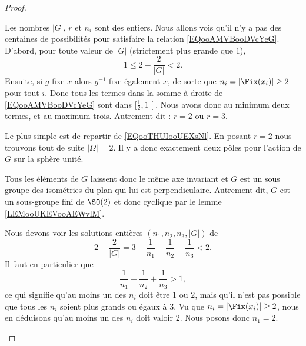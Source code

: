 \begin{proof}
\begin{subproof}
            Les nombres \( | G |\), \( r\) et \( n_i\) sont des entiers. Nous allons vois qu'il n'y a pas des centaines de possibilités pour satisfaire la relation \eqref{EQooAMVBooDVcYeG}. D'abord, pour toute valeur de \( | G |\) (strictement plus grande que \( 1\)),
            \begin{equation}
                1\leq 2-\frac{ 2 }{ | G | }<2.
            \end{equation}
            Ensuite, si \( g\) fixe \( x\) alors \( g^{-1}\) fixe également \( x\), de sorte que \( n_i=| \Fix(x_i) |\geq 2\) pour tout \( i\). Donc tous les termes dans la somme à droite de \eqref{EQooAMVBooDVcYeG} sont dans \( \mathopen[ \frac{ 1 }{2} , 1 \mathclose[\). Nous avons donc au minimum deux termes, et au maximum trois. Autrement dit : \( r=2\) ou \( r=3\).

            \item[Si \( r=2\)]

                Le plus simple est de repartir de \eqref{EQooTHUIooUEXsNl}. En posant \( r=2\) nous trouvons tout de suite \( | \Omega |=2\). Il y a donc exactement deux pôles pour l'action de \( G\) sur la sphère unité.

                Tous les éléments de \( G\) laissent donc le même axe invariant et \( G\) est un sous groupe des isométries du plan qui lui est perpendiculaire. Autrement dit, \( G\) est un sous-groupe fini de \( \SO(2)\) et donc cyclique par le lemme \ref{LEMooUKEVooAEWvlM}.

            \item[Les possibilités pour \( r=3\)]

                Nous devons voir les solutions entières \( (n_1,n_2,n_3,| G |)\) de
                \begin{equation}
                    2-\frac{ 2 }{ | G | }=3-\frac{1}{ n_1 }-\frac{1}{ n_2 }-\frac{1}{ n_3 }<2.
                \end{equation}
                Il faut en particulier que
                \begin{equation}
                    \frac{1}{ n_1 }+\frac{1}{ n_2 }+\frac{1}{ n_3 }>1,
                \end{equation}
                ce qui signifie qu'au moins un des \( n_i\) doit être \( 1\) ou \( 2\), mais qu'il n'est pas possible que tous les \( n_i\) soient plus grands ou égaux à \( 3\). Vu que \( n_i=| \Fix(x_i) |\geq 2\), nous en déduisons qu'au moins un des \( n_i\) doit valoir \( 2\). Nous posons donc \( n_1=2\).


\end{subproof}
\end{proof}
